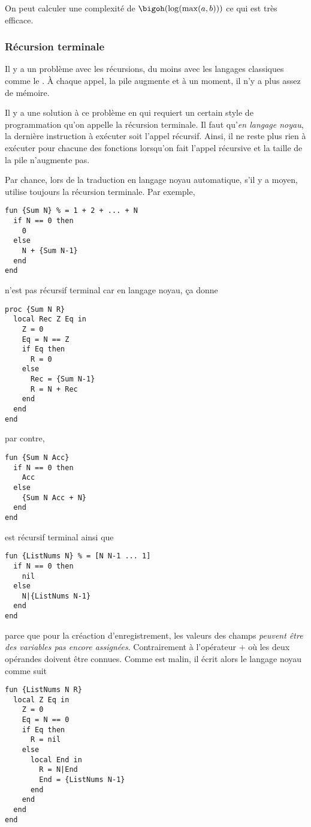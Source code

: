 On peut calculer une complexité de $\bigoh(\log(\max(a, b)))$
ce qui est très efficace.

\subsubsection{Récursion terminale}
Il y a un problème avec les récursions,
du moins avec les langages classiques comme le \java{}.
À chaque appel, la pile augmente et à un moment, il n'y a plus
assez de mémoire.

Il y a une solution à ce problème en \oz{} qui requiert
un certain style de programmation qu'on appelle la récursion terminale.
Il faut qu'\emph{en langage noyau},
la dernière instruction à exécuter soit l'appel récursif.
Ainsi, il ne reste plus rien à exécuter pour chacune des fonctions
lorsqu'on fait l'appel récursive et la taille de la pile n'augmente pas.

Par chance, lors de la traduction en langage noyau automatique,
s'il y a moyen, \oz{} utilise toujours la récursion terminale.
Par exemple,
\begin{lstlisting}
fun {Sum N} % = 1 + 2 + ... + N
  if N == 0 then
    0
  else
    N + {Sum N-1}
  end
end
\end{lstlisting}
n'est pas récursif terminal car en langage noyau, ça donne
\begin{lstlisting}
proc {Sum N R}
  local Rec Z Eq in
    Z = 0
    Eq = N == Z
    if Eq then
      R = 0
    else
      Rec = {Sum N-1}
      R = N + Rec
    end
  end
end
\end{lstlisting}
par contre,
\begin{lstlisting}
fun {Sum N Acc}
  if N == 0 then
    Acc
  else
    {Sum N Acc + N}
  end
end
\end{lstlisting}
est récursif terminal ainsi que
\begin{lstlisting}
fun {ListNums N} % = [N N-1 ... 1]
  if N == 0 then
    nil
  else
    N|{ListNums N-1}
  end
end
\end{lstlisting}
parce que pour la créaction d'enregistrement,
les valeurs des champs \emph{peuvent être des variables pas encore assignées}.
Contrairement à l'opérateur $+$ où les deux opérandes doivent être connues.
Comme \oz{} est malin, il écrit alors le langage noyau comme suit
\begin{lstlisting}
fun {ListNums N R}
  local Z Eq in
    Z = 0
    Eq = N == 0
    if Eq then
      R = nil
    else
      local End in
        R = N|End
        End = {ListNums N-1}
      end
    end
  end
end
\end{lstlisting}

